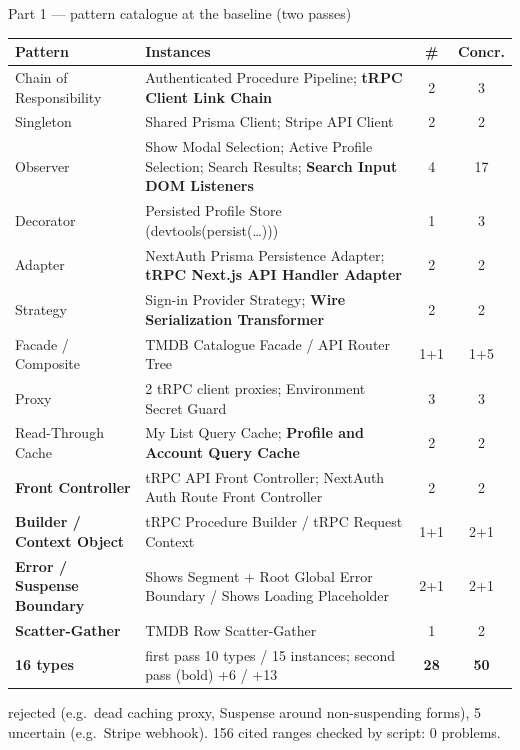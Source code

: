 \documentclass[aspectratio=169,10pt]{beamer}
\begin{document}
\begin{frame}{Part 1 --- pattern catalogue at the baseline (two passes)}
\scriptsize
\begin{tabular}{@{}lp{8.4cm}cc@{}}\toprule
Pattern & Instances & \# & Concr.\\\midrule
Chain of Responsibility & Authenticated Procedure Pipeline; \textbf{tRPC Client Link Chain} & 2 & 3\\
Singleton & Shared Prisma Client; Stripe API Client & 2 & 2\\
Observer & Show Modal Selection; Active Profile Selection; Search Results; \textbf{Search Input DOM Listeners} & 4 & 17\\
Decorator & Persisted Profile Store (devtools(persist(\dots))) & 1 & 3\\
Adapter & NextAuth Prisma Persistence Adapter; \textbf{tRPC Next.js API Handler Adapter} & 2 & 2\\
Strategy & Sign-in Provider Strategy; \textbf{Wire Serialization Transformer} & 2 & 2\\
Facade / Composite & TMDB Catalogue Facade / API Router Tree & 1+1 & 1+5\\
Proxy & 2 tRPC client proxies; Environment Secret Guard & 3 & 3\\
Read-Through Cache & My List Query Cache; \textbf{Profile and Account Query Cache} & 2 & 2\\
\textbf{Front Controller} & tRPC API Front Controller; NextAuth Auth Route Front Controller & 2 & 2\\
\textbf{Builder / Context Object} & tRPC Procedure Builder / tRPC Request Context & 1+1 & 2+1\\
\textbf{Error / Suspense Boundary} & Shows Segment + Root Global Error Boundary / Shows Loading Placeholder & 2+1 & 2+1\\
\textbf{Scatter-Gather} & TMDB Row Scatter-Gather & 1 & 2\\\midrule
\textbf{16 types} & first pass 10 types / 15 instances; second pass (bold) +6 / +13 & \textbf{28} & \textbf{50}\\\bottomrule
\end{tabular}
\par{} rejected (e.g.\ dead caching proxy, Suspense around non-suspending forms), 5 uncertain (e.g.\ Stripe webhook). 156 cited ranges checked by script: 0 problems.
\end{frame}
\end{document}
